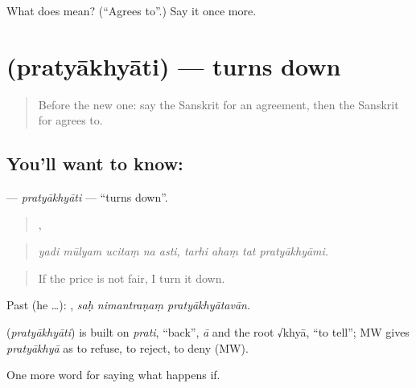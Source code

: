\begin{tcolorbox}[breakable,colback=teal!4,colframe=teal!35!black,title={Before you move on}]
What does  mean? (\textquotedblleft{}Agrees to\textquotedblright{}.) Say it once more.
\end{tcolorbox}
\section[\texorpdfstring{\sk{प्रत्याख्याति} (pratyākhyāti)}{प्रत्याख्याति (pratyākhyāti)}]{ (pratyākhyāti) — turns down}

\label{lesson:SA-C534-pratyakhyati}



\begin{quote}
Before the new one: say the Sanskrit for an agreement, then the Sanskrit for agrees to.
\end{quote}

\subsection*{You'll want to know: }
\textbf{} — \emph{pratyākhyāti} — \textquotedblleft{}turns down\textquotedblright{}.

\begin{quote}
    ,    
\end{quote}

\begin{quote}
\emph{yadi mūlyam ucitaṃ na asti, tarhi ahaṃ tat pratyākhyāmi.}
\end{quote}

\begin{quote}
If the price is not fair, I turn it down.
\end{quote}

Past (he …):   , \emph{saḥ nimantraṇaṃ pratyākhyātavān}.

\begin{cousinweb}
\textbf{} (\emph{pratyākhyāti}) is built on \emph{prati}, \textquotedblleft{}back\textquotedblright{}, \emph{ā} and the root √khyā, \textquotedblleft{}to tell\textquotedblright{}; MW gives \emph{pratyākhyā} as to refuse, to reject, to deny (MW).
\end{cousinweb}

\begin{grammarlens}[title={What you've built}]
One more word for saying what happens if.
\end{grammarlens}

